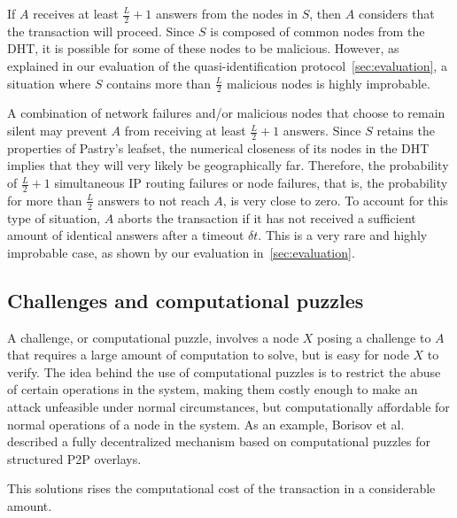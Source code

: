 If $A$ receives at least $\frac{L}{2} + 1$ answers from the nodes in $S$, then
$A$ considers that the transaction will proceed. Since $S$ is composed of
common nodes from the DHT, it is possible for some of these nodes to be
malicious. However, as explained in our evaluation of the quasi-identification
protocol~\ref{sec:evaluation}, a situation where $S$ contains more than
$\frac{L}{2}$ malicious nodes is highly improbable.

A combination of network failures and/or malicious nodes that choose to remain
silent may prevent $A$ from receiving at least $\frac{L}{2} + 1$ answers. Since
$S$ retains the properties of Pastry's leafset, the numerical closeness of its
nodes in the DHT implies that they will very likely be geographically far.
Therefore, the probability of $\frac{L}{2} + 1 $ simultaneous IP
routing failures or node failures, that is, the probability for more than
$\frac{L}{2}$ answers to not reach $A$, is very close to zero. To account for
this type of situation, $A$ aborts the transaction if it has not received a
sufficient amount of identical answers after a timeout $\delta t$. This is a
very rare and highly improbable case, as shown by our evaluation
in~\ref{sec:evaluation}.


\subsection{Challenges and computational puzzles}
\label{sec:challenges_puzzles}
A challenge, or computational puzzle, involves a node $X$ posing a challenge to
$A$ that requires a large amount of computation to solve, but is easy for node
$X$ to verify. The idea behind the use of
computational puzzles is to restrict the abuse of certain operations in the
system, making them costly enough to make an attack unfeasible under normal
circumstances, but computationally affordable for normal operations of a node
in the system. As an example, Borisov et al.~\cite{borisov2006computational} described a
fully decentralized mechanism based on computational puzzles for structured P2P
overlays.


This solutions rises the computational cost of the transaction in a
considerable amount.



